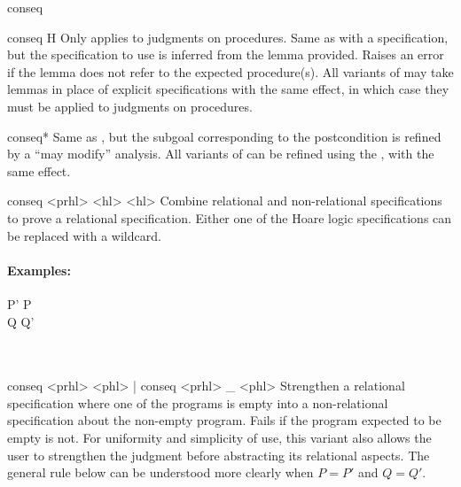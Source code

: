 \begin{tactic}{conseq}
  \begin{tsyntax}{conseq H}
  Only applies to judgments on procedures. Same as  with a
  specification, but the specification to use is inferred from the
  lemma  provided. Raises an error if the lemma does not refer
  to the expected procedure(s). All variants of  may take
  lemmas in place of explicit specifications with the same effect, in
  which case they must be applied to judgments on procedures.
  \end{tsyntax}

  \begin{tsyntax}{conseq*}
  Same as , but the subgoal corresponding to the
  postcondition is refined by a ``may modify'' analysis. All variants
  of  can be refined using the \ec{*}, with the same
  effect.
  \end{tsyntax}

  \begin{tsyntax}{conseq <prhl> <hl> <hl>}
  Combine relational and non-relational specifications to prove a
  relational specification. Either one of the Hoare logic
  specifications can be replaced with a wildcard.

  \paragraph{Examples:}\strut

  \begin{cmathpar}
    {P' \Rightarrow P \wedge {} \wedge {} \\
     Q \wedge {} \wedge {} \Rightarrow Q' \\
      \\
      \\
     }
    {}
  \end{cmathpar}
  \end{tsyntax}

  \begin{tsyntax}{conseq <prhl> <phl> | conseq <prhl> _ <phl>}
  Strengthen a relational specification where one of the programs is
  empty into a non-relational specification about the non-empty
  program. Fails if the program expected to be empty is not. For
  uniformity and simplicity of use, this variant also allows the user
  to strengthen the \prhl judgment before abstracting its relational
  aspects. The general rule below can be understood more clearly when
  $P = P'$ and $Q = Q'$.


\end{tsyntax}
\end{tactic}
